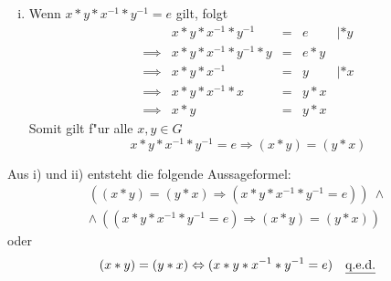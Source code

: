 \documentclass[10pt, oneside]{article}
\begin{document}
\begin{enumerate}[(a)]
\begin{enumerate}[i)]
            \pagebreak
            \item Wenn $x * y * x^{-1} * y^{-1} = e$ gilt, folgt
                \begin{equation*}
                    \begin{array}{rrcll}
                                 &x * y * x^{-1} * y^{-1} &=& e &| * y \\[5pt]
                        \implies &x * y * x^{-1} * y^{-1} * y &=& e * y \\[5pt]
                        \implies &x * y * x^{-1} &=& y &| * x \\[5pt]
                        \implies &x * y * x^{-1} * x &=& y * x \\[5pt]
                        \implies &x * y &=& y * x
                    \end{array}
                \end{equation*}
                Somit gilt f"ur alle $x, y \in G$
                $$x * y * x^{-1} * y^{-1} = e \Rightarrow (x * y) = (y * x)$$
        \end{enumerate}
        Aus i) und ii) entsteht die folgende Aussageformel:
        \begin{gather*}
            ((x * y) = (y * x) \Rightarrow (x * y * x^{-1} * y^{-1} = e))\ \land \\
            \land\ ((x * y * x^{-1} * y^{-1} = e) \Rightarrow (x * y) = (y * x))
        \end{gather*}
        oder
        \begin{equation*}
            (x * y) = (y * x) \Leftrightarrow (x * y * x^{-1} * y^{-1} = e) \quad \text{\underline{q.e.d.}}
        \end{equation*}
\end{enumerate}
\end{document}

